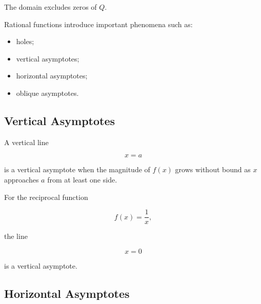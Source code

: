 The domain excludes zeros of \(Q\).

Rational functions introduce important phenomena such as:

\begin{itemize}
    \item holes;
    \item vertical asymptotes;
    \item horizontal asymptotes;
    \item oblique asymptotes.
\end{itemize}

\subsection{Vertical Asymptotes}
\label{subsec:vertical-asymptotes}

A vertical line

\[ x=a \]

is a vertical asymptote when the magnitude of \(f(x)\) grows without bound
as \(x\) approaches \(a\) from at least one side.

For the reciprocal function

\[ f(x)=\frac1x, \]

the line

\[ x=0 \]

is a vertical asymptote.

\begin{center}
\end{center}

\subsection{Horizontal Asymptotes}
\label{subsec:horizontal-asymptotes}

